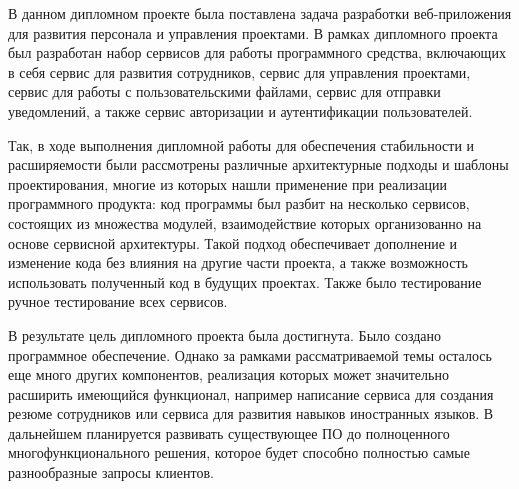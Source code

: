 
В данном дипломном проекте была поставлена задача разработки веб-приложения для развития персонала и управления проектами. В рамках дипломного проекта был разработан набор сервисов для работы программного средства, включающих в себя сервис для развития сотрудников, сервис для управления проектами, сервис для работы с пользовательскими файлами, сервис для отправки уведомлений, а также сервис авторизации и аутентификации пользователей.

Так, в ходе выполнения дипломной работы для обеспечения стабильности и расширяемости были рассмотрены различные архитектурные подходы и шаблоны проектирования, многие из которых нашли применение при реализации программного продукта: код программы был разбит на несколько сервисов, состоящих из множества модулей, взаимодействие которых организованно на основе сервисной архитектуры. Такой подход обеспечивает дополнение и изменение кода без влияния на другие части проекта, а также возможность использовать полученный код в будущих проектах. Также было тестирование ручное тестирование всех сервисов.

В результате цель дипломного проекта была достигнута. Было создано программное обеспечение. Однако за рамками рассматриваемой темы осталось еще много других компонентов, реализация которых может значительно расширить имеющийся функционал, например написание сервиса для создания резюме сотрудников или сервиса для развития навыков иностранных языков. В дальнейшем планируется развивать существующее ПО до полноценного многофункционального решения, которое будет способно полностью самые разнообразные запросы клиентов.
